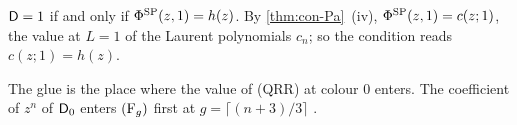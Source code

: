 \begin{cor}
\label{cor:con-A2}
$\mathsf{D}=1$ if and only if $\Phi^{\mathrm{SP}}(z,1)=h(z)$. By \cref{thm:con-Pa}~(iv), $\Phi^{\mathrm{SP}}(z,1)=c(z;1)$, the value at $L=1$ of the Laurent polynomials $c_n$; so the condition reads $c(z;1)=h(z)$.
\end{cor}

The glue is the place where the value of (QRR) at colour $0$ enters. The coefficient of $z^n$ of $\mathsf{D}_0$ enters $(\mathrm{F}_{g})$ first at $g=\lceil(n+3)/3\rceil$ .
